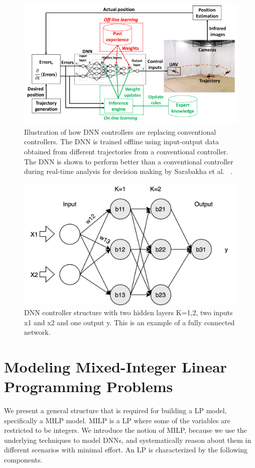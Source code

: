 \begin{figure}
	\centering
	\includegraphics[width=0.7\linewidth]{Images/DNNcontroller}
	\caption{Illustration of how DNN controllers are replacing conventional controllers. The DNN is trained offline using input-output data obtained from different trajectories from a conventional controller. The DNN is shown to perform better than a conventional controller during real-time analysis for decision making by  Sarabakha et al. ~\cite{sarabakha2019online}.}
	\label{fig:dnncontroller}
\end{figure}

\begin{figure}
	\centering
	\includegraphics[width=0.7\linewidth]{Images/DNNstructure}
	\caption[DNN structure]{DNN controller structure with two hidden layers K=1,2, two inputs x1 and x2 and one output y. This is an example of a fully connected network.}
	\label{fig:dnn-controller}
\end{figure}

\section{Modeling Mixed-Integer Linear Programming Problems}
\label{milp}
We present a general structure that is required for building a \ac{LP} model, specifically a \ac{MILP} model.
\ac{MILP} is a \ac{LP} where some of the variables are restricted to be integers. 
We introduce the notion of \ac{MILP}, because we use the underlying techniques to model \ac{DNN}s, and systematically reason about them in different scenarios with minimal effort. 
An \ac{LP} is characterized by the following components. 

